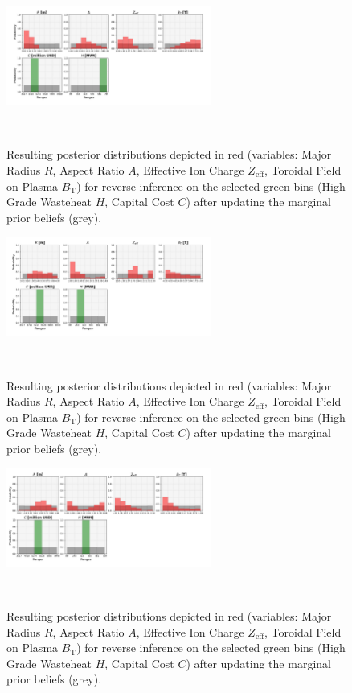 \begin{figure}[ht]
    \centering
    \includegraphics[width=0.6\textwidth]{figures/TE_results/march_data/config(57)_2outputs_9.png}
    \caption{Resulting posterior distributions depicted in red (variables: Major Radius $R$, Aspect Ratio $A$, Effective Ion Charge $Z_{\text{eff}}$, Toroidal Field on Plasma $B_{\text{T}}$) for reverse
    inference on the selected green bins (High Grade Wasteheat $H$, Capital Cost $C$) after updating the marginal prior beliefs (grey).}~\label{fig:config(57)_2outputs_9}
\end{figure}

\begin{figure}[ht]
    \centering
    \includegraphics[width=0.6\textwidth]{figures/TE_results/march_data/config(57)_2outputs_10.png}
    \caption{Resulting posterior distributions depicted in red (variables: Major Radius $R$, Aspect Ratio $A$, Effective Ion Charge $Z_{\text{eff}}$, Toroidal Field on Plasma $B_{\text{T}}$) for reverse
    inference on the selected green bins (High Grade Wasteheat $H$, Capital Cost $C$) after updating the marginal prior beliefs (grey).}~\label{fig:config(57)_2outputs_10}
\end{figure}

\begin{figure}[ht]
    \centering
    \includegraphics[width=0.6\textwidth]{figures/TE_results/march_data/config(57)_2outputs_11.png}
    \caption{Resulting posterior distributions depicted in red (variables: Major Radius $R$, Aspect Ratio $A$, Effective Ion Charge $Z_{\text{eff}}$, Toroidal Field on Plasma $B_{\text{T}}$) for reverse
    inference on the selected green bins (High Grade Wasteheat $H$, Capital Cost $C$) after updating the marginal prior beliefs (grey).}~\label{fig:config(57)_2outputs_11}
\end{figure}

